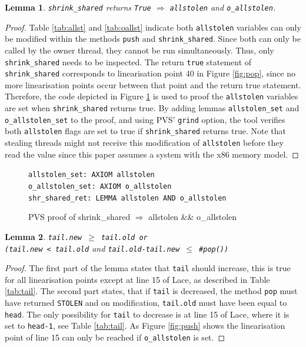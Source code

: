 \documentclass{sig-alternate-br}
\newtheorem{lemma}{Lemma}
\begin{document}
\begin{lemma}
	\texttt{shrink\_shared} returns \texttt{True} $\Rightarrow$ \texttt{allstolen} and \texttt{o\_allstolen}.
	\label{lem:shrinkshared}
\end{lemma}
\begin{proof}
	Table \ref{tab:allst} and \ref{tab:oallst} indicate both \texttt{allstolen} variables can only be modified within the methods \texttt{push} and \texttt{shrink\_shared}. Since both can only be called by the owner thread, they cannot be run simultaneously.  Thus, only \texttt{shrink\_shared} needs to be inspected. The return \texttt{true} statement of \texttt{shrink\_shared} corresponds to linearisation point 40 in Figure \ref{fig:pop}, since no more linearisation points occur between that point and the return true statement. Therefore, the code depicted in Figure \ref{pvs:shrshared} is used to proof the \texttt{allstolen} variables are set when \texttt{shrink\_shared} returns true. By adding lemmas \texttt{allstolen\_set} and \texttt{o\_allstolen\_set} to the proof, and using PVS' \texttt{grind} option, the tool verifies both \texttt{allstolen} flags are set to true if \texttt{shrink\_shared} returns true. Note that stealing threads might not receive this modification of \texttt{allstolen} before they read the value since this paper assumes a system with the x86 memory model.
\end{proof}
\begin{figure}
	\texttt{allstolen\_set: AXIOM allstolen}\\
	\texttt{o\_allstolen\_set: AXIOM o\_allstolen}\\
	\texttt{shr\_shared\_ret: LEMMA allstolen AND o\_allstolen}
	\caption{PVS proof of shrink\_shared $\Rightarrow$ allstolen \&\& o\_allstolen}
	\label{pvs:shrshared}
\end{figure}

\begin{lemma}
	\texttt{tail.new $\geq$ tail.old or\\(tail.new < tail.old} and \texttt{tail.old-tail.new $\leq$ \#pop())}
\end{lemma}
\begin{proof}
	The first part of the lemma states that \texttt{tail} should increase, this is true for all linearisation points except at line 15 of Lace, as described in Table \ref{tab:tail}.
	The second part states, that if \texttt{tail} is decreased, the method \texttt{pop} must have returned \texttt{STOLEN} and on modification, \texttt{tail.old} must have been equal to \texttt{head}.
	The only possibility for \texttt{tail} to decrease is at line 15 of Lace, where it is set to \texttt{head-1}, see Table \ref{tab:tail}.
	As Figure \ref{fig:push} shows the linearisation point of line 15 can only be reached if \texttt{o\_allstolen} is set.
	
\end{proof}
\end{document}
